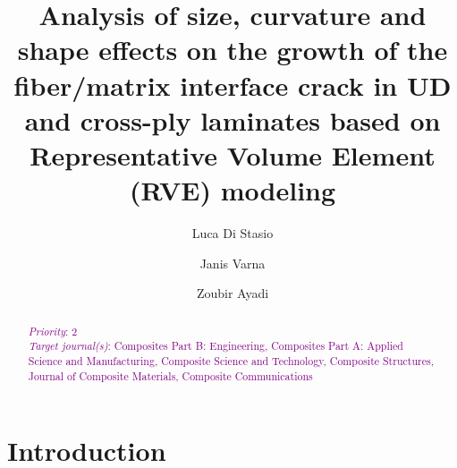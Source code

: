 \documentclass[review]{elsarticle}
\begin{document}
\begin{frontmatter}

\title{Analysis of size, curvature and shape effects on the growth of the fiber/matrix interface crack in UD and cross-ply laminates based on Representative Volume Element (RVE) modeling}


\author[nancy,lulea]{Luca Di Stasio}
\author[lulea]{Janis Varna}
\author[nancy]{Zoubir Ayadi}


\address[nancy]{Universit\'e de Lorraine, EEIGM, IJL, 6 Rue Bastien Lepage, F-54010 Nancy, France}
\address[lulea]{Lule\aa\ University of Technology, University Campus, SE-97187 Lule\aa, Sweden}

\begin{abstract}
\noindent
\textcolor{purple}{{\em Priority}: 2}\\
\textcolor{purple}{{\em Target journal(s)}: Composites Part B: Engineering, Composites Part A: Applied Science and Manufacturing, Composite Science and Technology, Composite Structures, Journal of Composite Materials, Composite Communications}\\
\end{abstract}


\end{frontmatter}

\linenumbers

\section{Introduction}
\end{document}
